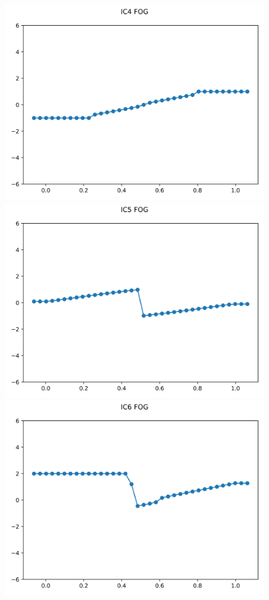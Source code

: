 \documentclass{article}
\begin{document}
\begin{figure}[t]
        \includegraphics[width=.95\textwidth]{../../code/unsafe_IC4Methodfu_plot.png}
        \includegraphics[width=.95\textwidth]{../../code/unsafe_IC5Methodfu_plot.png}
        \includegraphics[width=.95\textwidth]{../../code/unsafe_IC6Methodfu_plot.png}

\end{figure}
\end{document}
